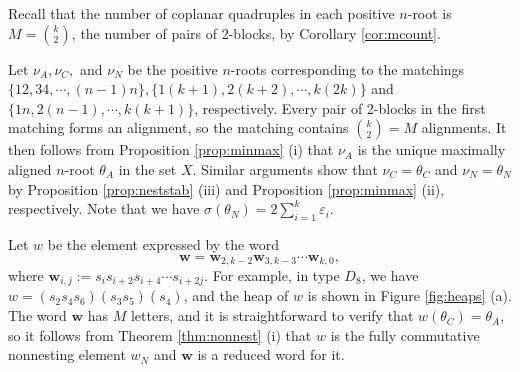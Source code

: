 \documentclass[11pt]{amsart}
\theoremstyle{plain}
\theoremstyle{definition}
\theoremstyle{remark}
\numberwithin{equation}{subsection}
\newcommand{\ep}{\varepsilon}
\newcommand{\bfw}{\mathbf{w}}
\begin{document}
Recall that the number of coplanar quadruples in each positive $n$-root is
$M=\binom{k}{2}$, the number of pairs of 2-blocks, by Corollary
\ref{cor:mcount}.

Let $\nu_A, \nu_C, $ and $\nu_N$ be the positive $n$-roots corresponding to the
matchings $\{12,34,\cdots, (n-1)n\}, \{1(k+1), 2(k+2), \cdots, k(2k)\}$ and
$\{1n, 2(n-1), \cdots, k(k+1)\}$, respectively. Every pair of 2-blocks in the
first matching forms an alignment, so the matching contains $\binom{k}{2}=M$
alignments.  It then follows from  Proposition \ref{prop:minmax} (i) that
$\nu_A$ is the unique maximally aligned $n$-root $\theta_A$ in the set $X$.
Similar arguments show that $\nu_C=\theta_C$ and $\nu_N=\theta_N$ by Proposition
\ref{prop:neststab} (iii) and Proposition \ref{prop:minmax} (ii), respectively.
Note that we have $\sigma(\theta_N)=2\sum_{i = 1}^k \ep_i$.

Let $w$ be the element expressed by the word $$ \bfw= \bfw_{2, k-2} \bfw_{3,
k-3} \cdots \bfw_{k, 0} ,$$ where $\bfw_{i, j} := s_i s_{i+2} s_{i+4} \cdots
s_{i+2j}$. For example, in type $D_8$, we have $w = (s_2 s_4 s_6)(s_3
s_5)(s_4)$, and the heap of $w$ is shown in Figure \ref{fig:heaps} (a).  The
word $\bfw$ has $M$ letters, and it is straightforward to verify that
$w(\theta_C)=\theta_A$, so it follows from Theorem \ref{thm:nonnest} (i) that
$w$ is the fully commutative nonnesting element $w_N$ and $\bfw$ is a reduced
word for it.
\end{document}
